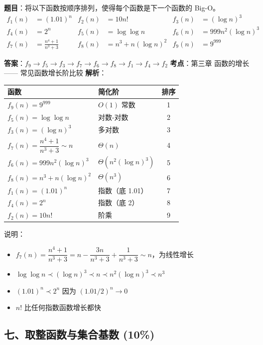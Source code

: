 \documentclass[10pt,a4paper,openany]{ctexbook}
\theoremstyle{definition}
\theoremstyle{remark}
\begin{document}
\textbf{题目}：将以下函数按顺序排列，使得每个函数是下一个函数的 Big-O。
\[
\begin{aligned}
f_1(n) &= (1.01)^n & f_2(n) &= 10n! & f_3(n) &= (\log n)^3 \\
f_4(n) &= 2^n & f_5(n) &= \log \log n & f_6(n) &= 999n^2(\log n)^3 \\
f_7(n) &= \frac{n^4+1}{n^3+3} & f_8(n) &= n^3 + n(\log n)^2 & f_9(n) &= 9^{999}
\end{aligned}
\]

\textbf{答案}：$f_9 \to f_5 \to f_3 \to f_7 \to f_6 \to f_8 \to f_1 \to f_4 \to f_2$
\textbf{考点}：第三章 函数的增长 —— 常见函数增长阶比较
\textbf{解析}：
\begin{center}
\begin{tabular}{llc}
\hline
函数 & 简化阶 & 排序 \\ \hline
$f_9(n) = 9^{999}$ & $O(1)$ 常数 & 1 \\
$f_5(n) = \log \log n$ & 对数-对数 & 2 \\
$f_3(n) = (\log n)^3$ & 多对数 & 3 \\
$f_7(n) = \dfrac{n^4+1}{n^3+3} \sim n$ & $\Theta(n)$ & 4 \\
$f_6(n) = 999n^2(\log n)^3$ & $\Theta(n^2(\log n)^3)$ & 5 \\
$f_8(n) = n^3 + n(\log n)^2$ & $\Theta(n^3)$ & 6 \\
$f_1(n) = (1.01)^n$ & 指数（底 1.01） & 7 \\
$f_4(n) = 2^n$ & 指数（底 2） & 8 \\
$f_2(n) = 10n!$ & 阶乘 & 9 \\
\hline
\end{tabular}

\end{center}

说明：
\begin{itemize}
\item $f_7(n) = \dfrac{n^4+1}{n^3+3} = n - \dfrac{3n}{n^3+3} + \dfrac{1}{n^3+3} \sim n$，为线性增长
\item $\log \log n \prec (\log n)^3 \prec n \prec n^2(\log n)^3 \prec n^3$
\item $(1.01)^n \prec 2^n$ 因为 $(1.01/2)^n \to 0$
\item $n!$ 比任何指数函数增长都快

\end{itemize}

\vspace{-2pt}

\subsection{七、取整函数与集合基数 (10\%)}
\end{document}
